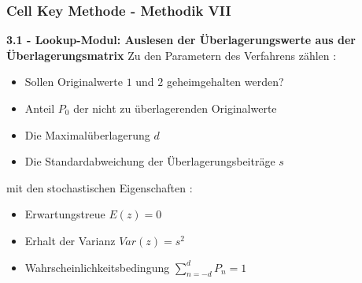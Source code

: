 \documentclass[aspectratio=169]{beamer}
\begin{document}
\begin{frame}{}
	\frametitle{Cell Key Methode - Methodik VII}
    \textbf{3.1 - Lookup-Modul:  Auslesen der Überlagerungswerte aus der Überlagerungsmatrix}
    Zu den Parametern des Verfahrens zählen \cite{Höhne}:
    \begin{itemize}
        \item Sollen Originalwerte $1$ und $2$ geheimgehalten werden?
        \item Anteil $P_0$ der nicht zu überlagerenden Originalwerte
        \item Die Maximalüberlagerung $d$
        \item Die Standardabweichung der Überlagerungsbeiträge $s$
    \end{itemize}
    mit den stochastischen Eigenschaften \cite{Höhne}:
    \begin{itemize}
        \item Erwartungstreue $E(z) = 0$
        \item Erhalt der Varianz $Var(z) = s^2$
        \item Wahrscheinlichkeitsbedingung $\sum_{n=-d}^{d} P_n = 1$
    \end{itemize}
\end{frame}
\end{document}
